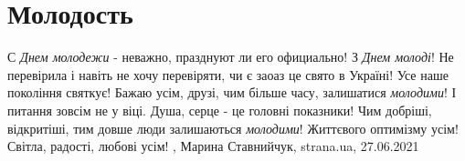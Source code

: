  
 
 
 
 
\chapter{Молодость}
\label{sec:slova.molodost}

С \emph{Днем молодежи} - неважно, празднуют ли его официально!  З \emph{Днем молоді}!  Не
перевірила і навіть не хочу перевіряти, чи є заоаз це свято в Україні!  Усе
наше покоління святкує!  Бажаю усім, друзі, чим більше часу, залишатися
\emph{молодими}!  І питання зовсім не у віці.  Душа, серце - це головні показники!
Чим добріші, відкритіші, тим довше люди залишаються \emph{молодими}!  Життєвого
оптимізму усім!  Світла, радості, любові усім!
, 
Марина Ставнийчук, strana.ua, 27.06.2021
